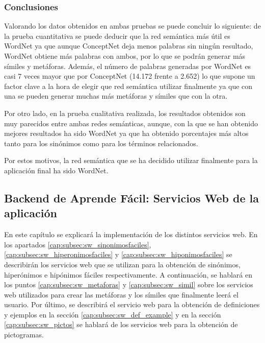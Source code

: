 \subsubsection{Conclusiones}
\label{sssec:conclusionPruebas}

Valorando los datos obtenidos en ambas pruebas se puede concluir lo siguiente: de la prueba cuantitativa se puede deducir que la red semántica más útil es WordNet ya que aunque ConceptNet deja menos palabras sin ningún resultado, WordNet obtiene más palabras con ambos, por lo que se podrán generar más símiles y metáforas. Además, el número de palabras generadas por WordNet es casi 7 veces mayor que por ConceptNet (14.172 frente a 2.652) lo que supone un factor clave a la hora de elegir que red semántica utilizar finalmente ya que con una se pueden generar muchas más metáforas y símiles que con la otra.

Por otro lado, en la prueba cualitativa realizada, los resultados obtenidos son muy parecidos entre ambas redes semánticas, aunque, con la que se han obtenido mejores resultados ha sido WordNet ya que ha obtenido porcentajes más altos tanto para los sinónimos como para los términos relacionados.

Por estos motivos, la red semántica que se ha decidido utilizar finalmente para la aplicación final ha sido WordNet.


\subsection{Backend de Aprende Fácil: Servicios Web de la aplicación}
\label{cap:subsec:backendapp}
En este capítulo se explicará la implementación de los distintos servicios web. En los apartados \ref{cap:subsec:sw_sinonimosfaciles}, \ref{cap:subsec:sw_hiperonimosfaciles} y \ref{cap:subsec:sw_hiponimosfaciles} se describirán los servicios web que se utilizan para la obtención de sinónimos, hiperónimos e hipónimos fáciles respectivamente. A continuación, se hablará en los puntos \ref{cap:subsec:sw_metaforas} y \ref{cap:subsec:sw_simil} sobre los servicios web utilizados para crear las metáforas y los símiles que finalmente leerá el usuario. Por último, se describirá el servicio web para la obtención de definiciones y ejemplos en la sección \ref{cap:subsec:sw_def_example} y en la sección \ref{cap:subsec:sw_pictos} se hablará de los servicios web para la obtención de pictogramas.



